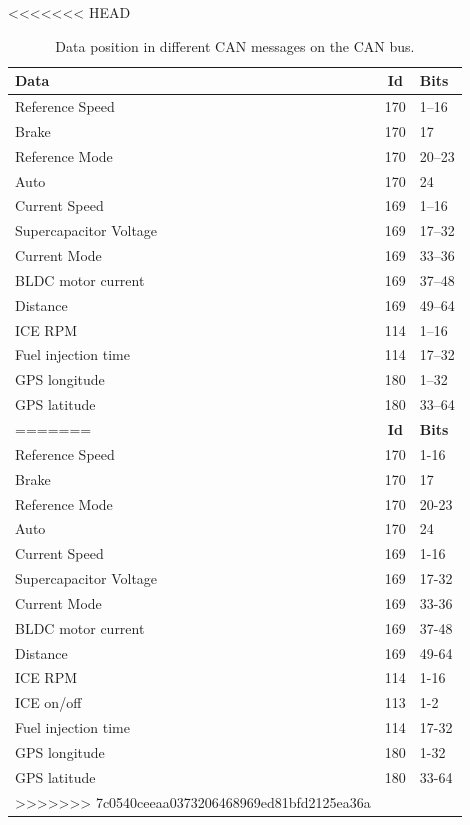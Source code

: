 \begin{table}[h]
\label{table:CAN}
\begin{center}
<<<<<<< HEAD
\begin{tabular}{lcl}
\textbf{Data} & \textbf{Id} & \textbf{Bits}\\
\toprule
Reference Speed & 170 & 1--16 \\
Brake & 170 & 17 \\
Reference Mode & 170 & 20--23 \\
Auto & 170 & 24 \\
Current Speed & 169 & 1--16 \\
Supercapacitor Voltage & 169 & 17--32 \\ 
Current Mode & 169 & 33--36 \\ 
BLDC motor current & 169 & 37--48 \\
Distance & 169 & 49--64 \\
ICE RPM & 114 & 1--16 \\
Fuel injection time & 114 & 17--32 \\
GPS longitude & 180 & 1--32 \\ 
GPS latitude & 180 & 33--64 \\
\bottomrule
=======
\begin{tabular}{|l|c|l|}
\hline
\textbf{Data} & \textbf{Id} & \textbf{Bits}\\ \hline
Reference Speed & 170 & 1-16 \\ \hline
Brake & 170 & 17 \\ \hline
Reference Mode & 170 & 20-23 \\ \hline
Auto & 170 & 24 \\ \hline
Current Speed & 169 & 1-16 \\ \hline
Supercapacitor Voltage & 169 & 17-32 \\ \hline
Current Mode & 169 & 33-36 \\ \hline
BLDC motor current & 169 & 37-48 \\ \hline
Distance & 169 & 49-64 \\ \hline
ICE RPM & 114 & 1-16 \\ \hline
ICE on/off & 113 & 1-2 \\ \hline
Fuel injection time & 114 & 17-32 \\ \hline
GPS longitude & 180 & 1-32 \\ \hline
GPS latitude & 180 & 33-64 \\ \hline
>>>>>>> 7c0540ceeaa0373206468969ed81bfd2125ea36a
\end{tabular}
\end{center}
\caption{Data position in different CAN messages on the CAN bus.}
\end{table}

